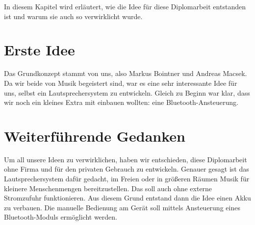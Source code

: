 In diesem Kapitel wird erläutert, wie die Idee für diese Diplomarbeit entstanden ist und warum sie auch so verwirklicht wurde.

\section{Erste Idee} \label{sec:1.1}
Das Grundkonzept stammt von uns, also Markus Bointner und Andreas Macsek. Da wir beide von Musik begeistert sind, war es eine sehr interessante Idee für uns, selbst ein Lautsprechersystem zu entwickeln. Gleich zu Beginn war klar, dass wir noch ein kleines Extra mit einbauen wollten: eine Bluetooth-Ansteuerung.

\section{Weiterführende Gedanken} \label{sec:1.2}
Um all unsere Ideen zu verwirklichen, haben wir entschieden, diese Diplomarbeit ohne Firma und für den privaten Gebrauch zu entwickeln. Genauer gesagt ist das Lautsprechersystem dafür gedacht, im Freien oder in größeren Räumen Musik für kleinere Menschenmengen bereitzustellen. Das soll auch ohne externe Stromzufuhr funktionieren. Aus diesem Grund entstand dann die Idee einen Akku zu verbauen. Die manuelle Bedienung am Gerät soll mittels Ansteuerung eines Bluetooth-Moduls ermöglicht werden.
